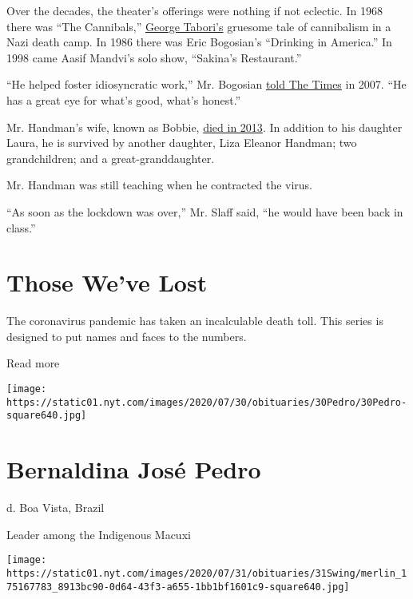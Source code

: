 Over the decades, the theater's offerings were nothing if not eclectic.
In 1968 there was ``The Cannibals,''
\href{https://www.nytimes.com/2007/07/27/theater/27tabori.html}{George
Tabori's} gruesome tale of cannibalism in a Nazi death camp. In 1986
there was Eric Bogosian's ``Drinking in America.'' In 1998 came Aasif
Mandvi's solo show, ``Sakina's Restaurant.''

``He helped foster idiosyncratic work,'' Mr. Bogosian
\href{https://www.nytimes.com/2007/05/20/nyregion/20wynn.html}{told The
Times} in 2007. ``He has a great eye for what's good, what's honest.''

Mr. Handman's wife, known as Bobbie,
\href{https://www.nytimes.com/2013/11/15/nyregion/bobbie-handman-a-medal-of-arts-winner-dies-at-85.html}{died
in 2013}. In addition to his daughter Laura, he is survived by another
daughter, Liza Eleanor Handman; two grandchildren; and a
great-granddaughter.

Mr. Handman was still teaching when he contracted the virus.

``As soon as the lockdown was over,'' Mr. Slaff said, ``he would have
been back in class.''

\href{https://www.nytimes.com/interactive/2020/obituaries/people-died-coronavirus-obituaries.html?action=click\&pgtype=Article\&state=default\&region=BELOW_MAIN_CONTENT\&context=covid_obits_promo}{}

\hypertarget{those-weve-lost}{%
\section{Those We've Lost}\label{those-weve-lost}}

The coronavirus pandemic has taken an incalculable death toll. This
series is designed to put names and faces to the numbers.

Read more

\texttt{[image: https://static01.nyt.com/images/2020/07/30/obituaries/30Pedro/30Pedro-square640.jpg]}

\hypertarget{bernaldina-josuxe9-pedro}{%
\section{Bernaldina José Pedro}\label{bernaldina-josuxe9-pedro}}

d. Boa Vista, Brazil

Leader among the Indigenous Macuxi

\texttt{[image: https://static01.nyt.com/images/2020/07/31/obituaries/31Swing/merlin\_175167783\_8913bc90-0d64-43f3-a655-1bb1bf1601c9-square640.jpg]}

